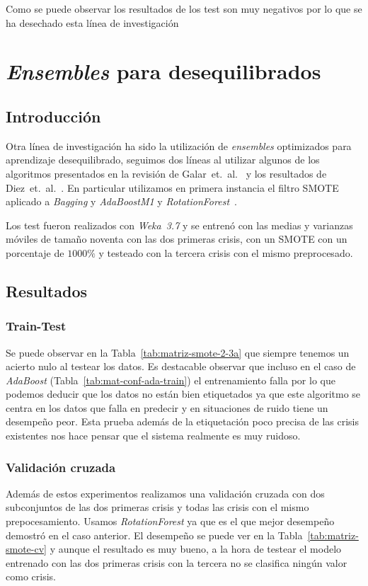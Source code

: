 \documentclass[a4paper,12pt,twoside,oldfontcommands]{memoir}
\begin{document}
Como se puede observar los resultados de los test son muy negativos por lo que se ha desechado esta línea de investigación

\chapter{\textit{Ensembles} para desequilibrados}\label{chap:ensdes}
\section{Introducción}
Otra línea de investigación ha sido la utilización de \textit{ensembles} optimizados para aprendizaje desequilibrado, seguimos dos líneas al utilizar algunos de los algoritmos presentados en la revisión de Galar~et.~al.~\cite{galar2012review} y los resultados de Diez~et.~al.~\cite{diez2015diversity}. En particular utilizamos en primera instancia el filtro SMOTE~\cite{wiki:smote} aplicado a \textit{Bagging} y \textit{AdaBoostM1} y \textit{RotationForest}~\cite{rodriguez2006rotation}.

Los test fueron realizados con \textit{Weka}~\textit{3.7} y se entrenó con las medias y varianzas móviles de tamaño noventa con las dos primeras crisis, con un SMOTE con un porcentaje de $1000\%$ y testeado con la tercera crisis con el mismo preprocesado.

\section{Resultados}
\subsection{Train-Test}
Se puede observar en la Tabla~\ref{tab:matriz-smote-2-3a} que siempre tenemos un acierto nulo al testear los datos. Es destacable observar que incluso en el caso de \textit{AdaBoost} (Tabla~\ref{tab:mat-conf-ada-train}) el entrenamiento falla por lo que podemos deducir que los datos no están bien etiquetados ya que este algoritmo se centra en los datos que falla en predecir y en situaciones de ruido tiene un desempeño peor. Esta prueba además de la etiquetación poco precisa de las crisis existentes nos hace pensar que el sistema realmente es muy ruidoso.

\subsection{Validación cruzada}
Además de estos experimentos realizamos una validación cruzada con dos subconjuntos de las dos primeras crisis y todas las crisis con el mismo prepocesamiento. Usamos \textit{RotationForest} ya que es el que mejor desempeño demostró en el caso anterior. El desempeño se puede ver en la Tabla~\ref{tab:matriz-smote-cv} y aunque el resultado es muy bueno, a la hora de testear el modelo entrenado con las dos primeras crisis con la tercera no se clasifica ningún valor como crisis.
\end{document}
